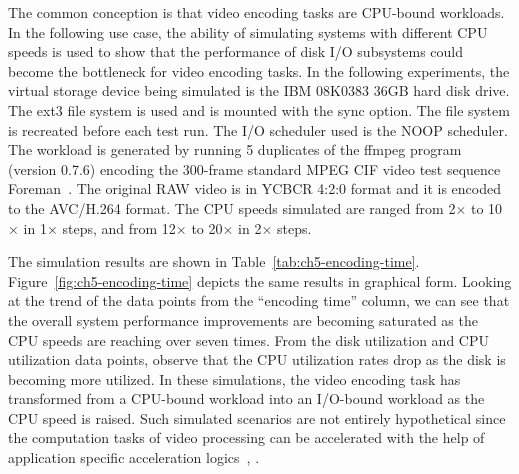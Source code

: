 The common conception is that video encoding tasks are CPU-bound workloads. In the following use case, the ability of simulating systems with different CPU speeds is used to show that the performance of disk I/O subsystems could become the bottleneck for video encoding tasks. In the following experiments, the virtual storage device being simulated is the IBM 08K0383 36GB hard disk drive. The ext3 file system is used and is mounted with the sync option. The file system is recreated before each test run. The I/O scheduler used is the NOOP scheduler. The workload is generated by running 5 duplicates of the ffmpeg program (version 0.7.6) encoding the 300-frame standard MPEG CIF video test sequence Foreman~\cite{FFmpeg:2013}. The original RAW video is in YCBCR 4:2:0 format and it is encoded to the AVC/H.264 format. The CPU speeds simulated are ranged from 2$\times$ to 10$\times$ in 1$\times$ steps, and from 12$\times$ to 20$\times$ in 2$\times$ steps.

The simulation results are shown in Table~\ref{tab:ch5-encoding-time}. Figure~\ref{fig:ch5-encoding-time} depicts the same results in graphical form. Looking at the trend of the data points from the ``encoding time'' column, we can see that the overall system performance improvements are becoming saturated as the CPU speeds are reaching over seven times. From the disk utilization and CPU utilization data points, observe that the CPU utilization rates drop as the disk is becoming more utilized. In these simulations, the video encoding task has transformed from a CPU-bound workload into an I/O-bound workload as the CPU speed is raised. Such simulated scenarios are not entirely hypothetical since the computation tasks of video processing can be accelerated with the help of application specific acceleration logics~\cite{Wu:2009}, \cite{Wu:2015:ASAP}.


